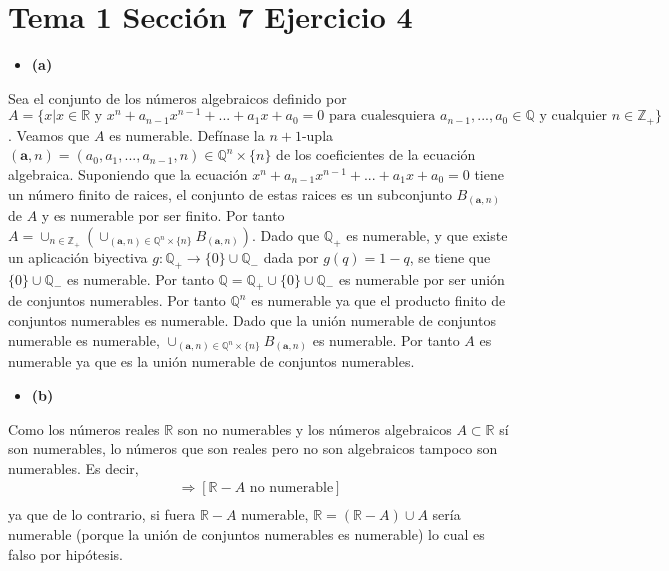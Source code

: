 \documentclass{article}
\newcommand{\vect}[1]{\boldsymbol{#1}}
\begin{document}
\section{Tema 1 Sección 7 Ejercicio 4}
\begin{itemize}
\item \bf (a) \rm
\end{itemize}
Sea el conjunto de los números algebraicos definido por $A=\{x|x\in \mathbb{R} \text{ y } x^n+a_{n-1}x^{n-1}+...+a_1x+a_0=0 \text{ para cualesquiera }a_{n-1},...,a_0\in\mathbb{Q} \text{ y cualquier }n\in \mathbb{Z}_{+} \}$. Veamos que $A$ es numerable. Defínase la $n+1$-upla $(\vect{a},n)=(a_0,a_1,...,a_{n-1},n)\in \mathbb{Q}^n\times\{n\}$ de los coeficientes de la ecuación algebraica. Suponiendo que la ecuación $x^n+a_{n-1}x^{n-1}+...+a_1x+a_0=0$ tiene un número finito de raices, el conjunto de estas raices es un subconjunto $B_{(\vect{a},n)}$ de $A$ y es numerable por ser finito. Por tanto $A=\cup_{n\in\mathbb{Z}_{+}}\left(\cup_{(\vect{a},n)\in \mathbb{Q}^n\times \{n\}}B_{(\vect{a},n)}\right)$. Dado que $\mathbb{Q}_{+}$ es numerable, y que existe un aplicación biyectiva $g:\mathbb{Q}_{+}\rightarrow \{0\}\cup \mathbb{Q}_{-}$ dada por $g(q)=1-q$, se tiene que $\{0\}\cup\mathbb{Q}_{-}$ es numerable. Por tanto $\mathbb{Q}=\mathbb{Q}_{+}\cup\{0\}\cup\mathbb{Q}_{-}$ es numerable por ser unión de conjuntos numerables. Por tanto $\mathbb{Q}^n$ es numerable ya que el producto finito de conjuntos numerables es numerable. Dado que la unión numerable de conjuntos numerable es numerable, $\cup_{(\vect{a},n)\in \mathbb{Q}^n\times \{n\}}B_{(\vect{a},n)}$ es numerable. Por tanto $A$ es numerable ya que es la unión numerable de conjuntos numerables.
\begin{itemize}
\item \bf (b) \rm
\end{itemize}
Como los números reales $\mathbb{R}$ son no numerables y los números algebraicos $A\subset \mathbb{R}$ sí son numerables, lo números que son reales pero no son algebraicos tampoco son numerables. Es decir,
\begin{eqnarray}
[\mathbb{R} \text{ no numerable y }A \text{ numerable}]\Rightarrow [\mathbb{R}-A\text{ no numerable}]\nonumber\\
\end{eqnarray}
ya que de lo contrario, si fuera $\mathbb{R}-A$ numerable, $\mathbb{R}=(\mathbb{R}-A)\cup A$ sería numerable (porque la unión de conjuntos numerables es numerable) lo cual es falso por hipótesis. 
\end{document}
